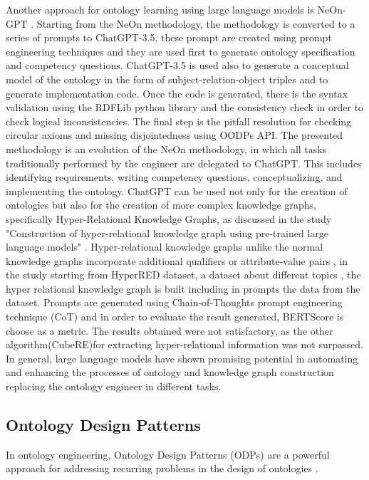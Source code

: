 Another approach for ontology learning using large language models is NeOn-GPT \cite{fathallah2024neon}. Starting from the NeOn methodology, the methodology is converted to a series of prompts to ChatGPT-3.5, these prompt are created using prompt engineering techniques and they are used first to generate ontology specification and competency questions. ChatGPT-3.5 is used also to generate a conceptual model of the ontology in the form of subject-relation-object triples and to generate implementation code. Once the code is generated, there is the syntax validation using the RDFLib python library \cite{rdflib} and the consistency check in order to check logical inconsistencies. The final step is the pitfall resolution for checking circular axioms and missing disjointedness using OODPs API. The presented methodology is an evolution of the NeOn methodology, in which all tasks traditionally performed by the engineer are delegated to ChatGPT. This includes identifying requirements, writing competency questions, conceptualizing, and implementing the ontology.%
ChatGPT can be used not only for the creation of ontologies but also for the creation of more complex knowledge graphs, specifically Hyper-Relational Knowledge Graphs, as discussed in the study "Construction of hyper-relational knowledge graph using pre-trained large language models" \cite{datta2024construction}. Hyper-relational knowledge graphs unlike the normal knowledge graphs incorporate additional qualifiers or attribute-value pairs \cite{hyper}, in the study starting from HyperRED dataset, a dataset about different topics , the hyper relational knowledge graph is built including in prompts the data from the dataset. Prompts are generated using Chain-of-Thoughts prompt engineering technique (CoT) and in order to evaluate the result generated, BERTScore is choose as a metric. The results obtained were not satisfactory, as the other algorithm(CubeRE)for extracting hyper-relational information was not surpassed.
In general, large language models have shown promising potential  in automating and enhancing the processes of ontology and knowledge graph construction replacing the ontology engineer in different tasks.

\newpage
\subsection{Ontology Design Patterns}
\label{subsection:2_2_ontology_design_patterns}
In ontology engineering, Ontology Design Patterns (ODPs) \cite{odps} are a powerful approach for addressing recurring problems in the design of ontologies \cite{hitzler2016ontology}.

